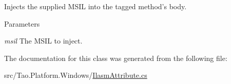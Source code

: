 Injects the supplied MSIL into the tagged method's body. 


\begin{DoxyParams}{Parameters}
\item[{\em msil}]The MSIL to inject. \end{DoxyParams}


The documentation for this class was generated from the following file:\begin{DoxyCompactItemize}
\item 
src/Tao.Platform.Windows/\hyperlink{_ilasm_attribute_8cs}{IlasmAttribute.cs}\end{DoxyCompactItemize}
